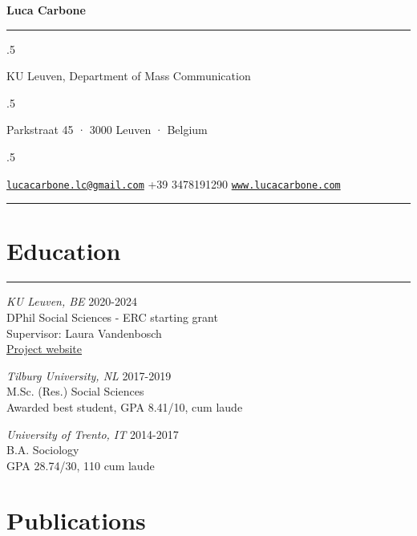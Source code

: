\documentclass[12pt,]{article}
\begin{document}
\centerline{\huge \bf Luca Carbone}

\vspace{2 mm}

\hrule

\vspace{2 mm}

\moveleft.5\hoffset\centerline{KU Leuven, Department of Mass Communication}
\moveleft.5\hoffset\centerline{Parkstraat 45 · 3000 Leuven · Belgium}
\moveleft.5\hoffset\centerline{ \faEnvelopeO \hspace{1 mm} \href{mailto:}{\tt \href{mailto:lucacarbone.lc@gmail.com}{\nolinkurl{lucacarbone.lc@gmail.com}}} \hspace{1 mm}  \faPhone \hspace{1 mm}  +39 3478191290  \hspace{1 mm}      \faGlobe \hspace{1 mm} \href{http://www.lucacarbone.com}{\tt www.lucacarbone.com}   } 

\vspace{2 mm}

\hrule


\hypertarget{education}{%
\section{Education}\label{education}}

\vspace{-10pt}
\rule{1\linewidth}{\linethickness}

\emph{KU Leuven, BE} \hfill \begingroup\small 2020-2024\endgroup\\
DPhil Social Sciences - ERC starting grant\\
Supervisor: Laura Vandenbosch\\
\href{https://ercmimic.netlify.com/}{Project website}

\emph{Tilburg University, NL}
\hfill \begingroup\small 2017-2019\endgroup\\
M.Sc. (Res.) Social Sciences\\
Awarded best student, GPA 8.41/10, cum laude

\emph{University of Trento, IT}
\hfill \begingroup\small 2014-2017\endgroup\\
B.A. Sociology\\
GPA 28.74/30, 110 cum laude

\hypertarget{publications}{%
\section{Publications}\label{publications}}
\end{document}
